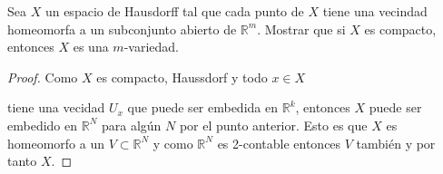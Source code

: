 
    \item Sea \( X \) un espacio de Hausdorff tal que cada punto de \( X \) tiene una vecindad homeomorfa a un subconjunto abierto de \( \mathbb{R}^m \). Mostrar que si \( X \) es compacto, entonces \( X \) es una \( m \)-variedad.


\begin{proof}

Como $X$ es compacto, Haussdorf y todo $x\in X$ 

tiene una vecidad $U_x$ que puede ser embedida en $\mathbb{R}^k$, entonces $X$ puede ser embedido en $\mathbb{R}^{N}$  para algún $N$ por  el punto anterior. Esto es que $X$ es homeomorfo a un $V\subset \mathbb{R}^{N}$ y como $\mathbb{R}^N$ es 2-contable entonces $V$ también y por tanto $X$. 
\end{proof}